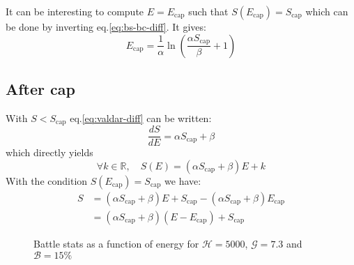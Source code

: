\documentclass[12pt]{article}
\def\happy{\mathcal{H}}
\def\gym{\mathcal{G}}
\def\bonus{\mathcal{B}}
\def\Sc{S_\text{cap}}
\def\Ec{E_\text{cap}}
\begin{document}
It can be interesting to compute $E=\Ec$ such that $S(\Ec)=\Sc$ which can be done by inverting eq.\eqref{eq:bs-bc-diff}. It gives:
\begin{equation}
    \Ec = \frac{1}{\alpha}\ln\left(\frac{\alpha \Sc}{\beta} +1 \right)
\end{equation}

\subsection{After cap}
With $S<\Sc$ eq.\eqref{eq:valdar-diff} can be written:
\begin{equation}
    \frac{dS}{dE}  = \alpha \Sc + \beta
\end{equation}
which directly yields
\begin{equation}
    \forall k \in \mathbb{R},\quad S(E)  = (\alpha \Sc + \beta) E + k
\end{equation}
With the condition $S(\Ec)=\Sc$ we have:
\begin{equation}
    \begin{aligned}
        S & = (\alpha \Sc + \beta)E + \Sc - (\alpha \Sc + \beta) \Ec \\
          & = (\alpha \Sc + \beta) (E - \Ec) + \Sc
    \end{aligned}
\end{equation}

\begin{figure}[!h]
    \centering

    \caption{Battle stats as a function of energy for $\happy = 5000$, $\gym = 7.3$ and $\bonus= 15\%$}
\end{figure}
\end{document}
